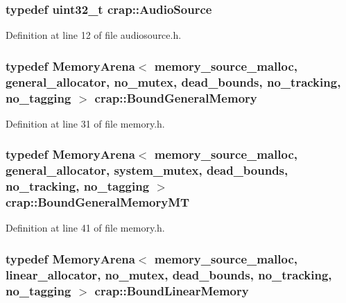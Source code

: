 \hypertarget{namespacecrap_a462d678db37c6a434145136ab6d59720}{
\subsubsection[{Audio\+Source}]{\setlength{\rightskip}{0pt plus 5cm}typedef uint32\+\_\+t {\bf crap\+::\+Audio\+Source}}}\label{namespacecrap_a462d678db37c6a434145136ab6d59720}


Definition at line 12 of file audiosource.\+h.

\hypertarget{namespacecrap_aaff1250c80e3631796871d2e94b4d187}{
\subsubsection[{Bound\+General\+Memory}]{\setlength{\rightskip}{0pt plus 5cm}typedef {\bf Memory\+Arena}$<$ {\bf memory\+\_\+source\+\_\+malloc}, {\bf general\+\_\+allocator}, {\bf no\+\_\+mutex}, {\bf dead\+\_\+bounds}, {\bf no\+\_\+tracking}, {\bf no\+\_\+tagging} $>$ {\bf crap\+::\+Bound\+General\+Memory}}}\label{namespacecrap_aaff1250c80e3631796871d2e94b4d187}


Definition at line 31 of file memory.\+h.

\hypertarget{namespacecrap_a319a79ca62a9c225a5e10d662c366828}{
\subsubsection[{Bound\+General\+Memory\+M\+T}]{\setlength{\rightskip}{0pt plus 5cm}typedef {\bf Memory\+Arena}$<$ {\bf memory\+\_\+source\+\_\+malloc}, {\bf general\+\_\+allocator}, {\bf system\+\_\+mutex}, {\bf dead\+\_\+bounds}, {\bf no\+\_\+tracking}, {\bf no\+\_\+tagging} $>$ {\bf crap\+::\+Bound\+General\+Memory\+M\+T}}}\label{namespacecrap_a319a79ca62a9c225a5e10d662c366828}


Definition at line 41 of file memory.\+h.

\hypertarget{namespacecrap_aa20da4e8cbab540052136fe0dc25815c}{
\subsubsection[{Bound\+Linear\+Memory}]{\setlength{\rightskip}{0pt plus 5cm}typedef {\bf Memory\+Arena}$<$ {\bf memory\+\_\+source\+\_\+malloc}, {\bf linear\+\_\+allocator}, {\bf no\+\_\+mutex}, {\bf dead\+\_\+bounds}, {\bf no\+\_\+tracking}, {\bf no\+\_\+tagging} $>$ {\bf crap\+::\+Bound\+Linear\+Memory}}}\label{namespacecrap_aa20da4e8cbab540052136fe0dc25815c}


